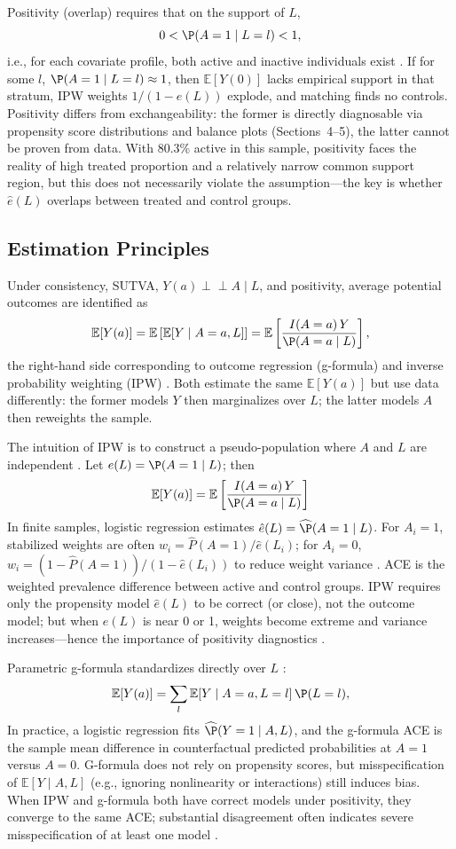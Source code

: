 \documentclass[12pt,a4paper]{article}
\newcommand{\E}{\mathbb{E}}
\newcommand{\indep}{\perp\!\!\!\perp}
\begin{document}
Positivity (overlap) requires that on the support of $L$,
\[
0<\P(A=1\mid L=l)<1,
\]
i.e., for each covariate profile, both active and inactive individuals exist \cite{hernan2024whatif,chen2024iptw}. If for some $l$, $\P(A=1\mid L=l)\approx 1$, then $\E[Y(0)]$ lacks empirical support in that stratum, IPW weights $1/(1-e(L))$ explode, and matching finds no controls. Positivity differs from exchangeability: the former is directly diagnosable via propensity score distributions and balance plots (Sections~4--5), the latter cannot be proven from data. With 80.3\% active in this sample, positivity faces the reality of high treated proportion and a relatively narrow common support region, but this does not necessarily violate the assumption---the key is whether $\hat e(L)$ overlaps between treated and control groups.

\subsection{Estimation Principles}

Under consistency, SUTVA, $Y(a)\indep A\mid L$, and positivity, average potential outcomes are identified as
\[
\E[Y(a)]=\E\left[\E[Y\mid A=a,L]\right]=\E\left[\frac{I(A=a)\,Y}{\P(A=a\mid L)}\right],
\]
the right-hand side corresponding to outcome regression (g-formula) and inverse probability weighting (IPW) \cite{hernan2024whatif}. Both estimate the same $\E[Y(a)]$ but use data differently: the former models $Y$ then marginalizes over $L$; the latter models $A$ then reweights the sample.

The intuition of IPW is to construct a pseudo-population where $A$ and $L$ are independent \cite{chen2024iptw}. Let $e(L)=\P(A=1\mid L)$; then
\[
\E[Y(a)]=\E\left[\frac{I(A=a)\,Y}{\P(A=a\mid L)}\right]
\]
In finite samples, logistic regression estimates $\hat e(L)=\widehat{\P}(A=1\mid L)$. For $A_i=1$, stabilized weights are often $w_i=\hat P(A=1)/\hat e(L_i)$; for $A_i=0$, $w_i=(1-\hat P(A=1))/(1-\hat e(L_i))$ to reduce weight variance \cite{chen2024iptw}. ACE is the weighted prevalence difference between active and control groups. IPW requires only the propensity model $\hat e(L)$ to be correct (or close), not the outcome model; but when $e(L)$ is near 0 or 1, weights become extreme and variance increases---hence the importance of positivity diagnostics \cite{chen2024iptw,hernan2024whatif}.

Parametric g-formula standardizes directly over $L$ \cite{hernan2024whatif}:
\[
\E[Y(a)]=\sum_l \E[Y\mid A=a,L=l]\,\P(L=l),
\]
In practice, a logistic regression fits $\widehat{\P}(Y=1\mid A,L)$, and the g-formula ACE is the sample mean difference in counterfactual predicted probabilities at $A=1$ versus $A=0$. G-formula does not rely on propensity scores, but misspecification of $\E[Y\mid A,L]$ (e.g., ignoring nonlinearity or interactions) still induces bias. When IPW and g-formula both have correct models under positivity, they converge to the same ACE; substantial disagreement often indicates severe misspecification of at least one model \cite{shahu2023comparison}.
\end{document}
